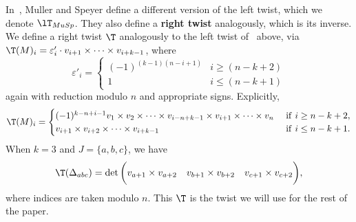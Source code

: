In~\cite{mullerspeyer}, Muller and Speyer define a different version of the left twist, which we denote $\lT_{MuSp}$. They also define a \textbf{right twist} analogously, which is its inverse. We define a right twist $\T$ analogously to the left twist of~\cite{marshscott2016} above, via $\T(M)_i= \varepsilon'_i \cdot v_{i+1} \times \dots \times v_{i+k-1}$, where
\[\varepsilon'_i = \begin{cases}
(-1)^{(k-1)(n-i+1)} & i \geq (n-k+2)\\
1 & i \leq (n-k+1)
\end{cases}\]
again with reduction modulo $n$ and appropriate signs. Explicitly,
{\small $$\T(M)_i = \begin{cases} 
(-1)^{k-n+i-1} v_1 \times v_2 \times \dots \times v_{i-n+k-1} \times v_{i+1} \times \dots \times v_n & \mathrm{~if~} i\geq n-k+2, \\
v_{i+1} \times v_{i+2} \times \dots \times v_{i+k-1} & \mathrm{~if~} i\leq n-k+1. \end{cases}$$}
When $k=3$ and $J=\{a,b,c\}$, we have
$$\T(\Delta_{abc}) = \det \bigg(v_{a+1} \times v_{a+2} \quad v_{b+1} \times v_{b+2} \quad 
v_{c+1} \times v_{c+2}\bigg),$$ 
where indices are taken modulo $n$.
This $\T$ is the twist we will use for the rest of the paper.

